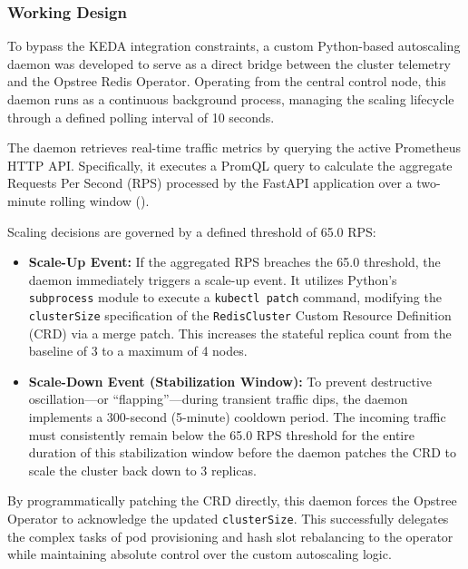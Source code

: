 \subsubsection{Working Design}
\label{subsubsec:working-design}

    To bypass the KEDA integration constraints, a custom Python-based autoscaling daemon was developed to serve as a direct bridge between the cluster telemetry and the Opstree Redis Operator. Operating from the central control node, this daemon runs as a continuous background process, managing the scaling lifecycle through a defined polling interval of 10 seconds.

    The daemon retrieves real-time traffic metrics by querying the active Prometheus HTTP API. Specifically, it executes a PromQL query to calculate the aggregate Requests Per Second (RPS) processed by the FastAPI application over a two-minute rolling window (). 

    Scaling decisions are governed by a defined threshold of 65.0 RPS:
    \begin{itemize}
        \item \textbf{Scale-Up Event:} If the aggregated RPS breaches the 65.0 threshold, the daemon immediately triggers a scale-up event. It utilizes Python's \texttt{subprocess} module to execute a \texttt{kubectl patch} command, modifying the \texttt{clusterSize} specification of the \texttt{RedisCluster} Custom Resource Definition (CRD) via a merge patch. This increases the stateful replica count from the baseline of 3 to a maximum of 4 nodes.
        \item \textbf{Scale-Down Event (Stabilization Window):} To prevent destructive oscillation---or ``flapping''---during transient traffic dips, the daemon implements a 300-second (5-minute) cooldown period. The incoming traffic must consistently remain below the 65.0 RPS threshold for the entire duration of this stabilization window before the daemon patches the CRD to scale the cluster back down to 3 replicas. 
    \end{itemize}

    By programmatically patching the CRD directly, this daemon forces the Opstree Operator to acknowledge the updated \texttt{clusterSize}. This successfully delegates the complex tasks of pod provisioning and hash slot rebalancing to the operator while maintaining absolute control over the custom autoscaling logic.

